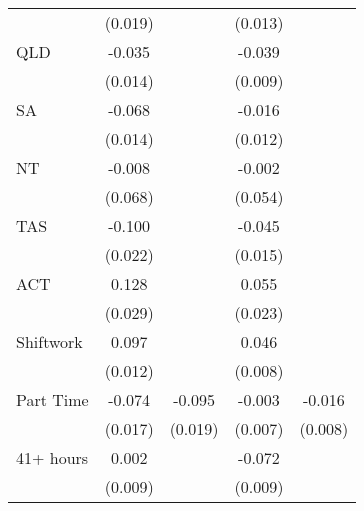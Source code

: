 {\begin{tabular}{l*{4}{c}}
                    &     (0.019)         &                     &     (0.013)         &                     \\
[1em]
QLD                 &      -0.035\sym{*}  &                     &      -0.039\sym{***}&                     \\
                    &     (0.014)         &                     &     (0.009)         &                     \\
[1em]
SA                  &      -0.068\sym{***}&                     &      -0.016         &                     \\
                    &     (0.014)         &                     &     (0.012)         &                     \\
[1em]
NT                  &      -0.008         &                     &      -0.002         &                     \\
                    &     (0.068)         &                     &     (0.054)         &                     \\
[1em]
TAS                 &      -0.100\sym{***}&                     &      -0.045\sym{**} &                     \\
                    &     (0.022)         &                     &     (0.015)         &                     \\
[1em]
ACT                 &       0.128\sym{***}&                     &       0.055\sym{*}  &                     \\
                    &     (0.029)         &                     &     (0.023)         &                     \\
[1em]
Shiftwork           &       0.097\sym{***}&                     &       0.046\sym{***}&                     \\
                    &     (0.012)         &                     &     (0.008)         &                     \\
[1em]
Part Time           &      -0.074\sym{***}&      -0.095\sym{***}&      -0.003         &      -0.016\sym{*}  \\
                    &     (0.017)         &     (0.019)         &     (0.007)         &     (0.008)         \\
[1em]
41+ hours           &       0.002         &                     &      -0.072\sym{***}&                     \\
                    &     (0.009)         &                     &     (0.009)         &                     \\

\end{tabular}}
